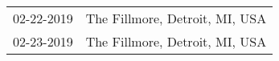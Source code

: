 \begin{supertabular}{ll}
 02-22-2019 &  The Fillmore, Detroit, MI, USA \\
 02-23-2019 &  The Fillmore, Detroit, MI, USA \\
\end{supertabular}
